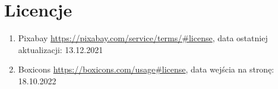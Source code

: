 \documentclass[12pt]{article}
\begin{document}
	\section{Licencje}
		\begin{enumerate}
			\item	Pixabay
			\url{https://pixabay.com/service/terms/#license}, 
			data ostatniej aktualizacji: 13.12.2021
			
			
			\item	Boxicons
			\url{https://boxicons.com/usage#license}, 
			data wejścia na stronę: 18.10.2022
		\end{enumerate}
	
	
\end{document}
